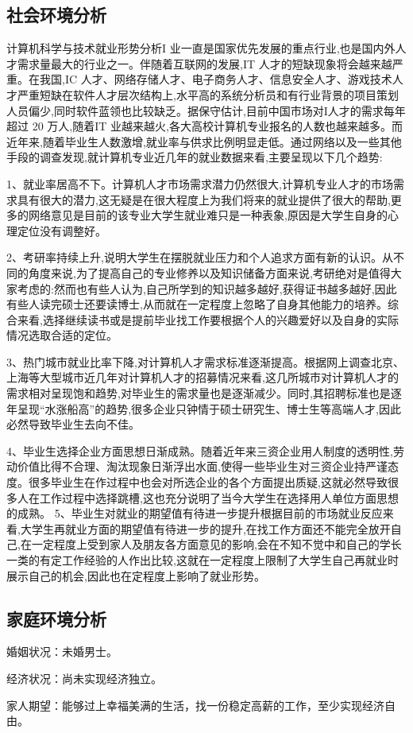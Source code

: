 \documentclass{article}
\begin{document}
\subsection{社会环境分析}
计算机科学与技术就业形势分析I 业一直是国家优先发展的重点行业,也是国内外人才需求量最大的行业之一。伴随着互联网的发展,IT 人才的短缺现象将会越来越严重。在我国,IC 人才、网络存储人才、电子商务人才、信息安全人才、游戏技术人才严重短缺在软件人才层次结构上,水平高的系统分析员和有行业背景的项目策划人员偏少,同时软件蓝领也比较缺乏。据保守估计,目前中国市场对I人才的需求每年超过 20 万人,随着IT 业越来越火,各大高校计算机专业报名的人数也越来越多。而近年来,随着毕业生人数激增,就业率与供求比例明显走低。通过网络以及一些其他手段的调查发现,就计算机专业近几年的就业数据来看,主要呈现以下几个趋势:\par
1、就业率居高不下。计算机人才市场需求潜力仍然很大,计算机专业人才的市场需求具有很大的潜力,这无疑是在很大程度上为我们将来的就业提供了很大的帮助,更多的网络意见是目前的该专业大学生就业难只是一种表象,原因是大学生自身的心理定位没有调整好。\par
2、考研率持续上升,说明大学生在摆脱就业压力和个人追求方面有新的认识。从不同的角度来说,为了提高自己的专业修养以及知识储备方面来说,考研绝对是值得大家考虑的:然而也有些人认为,自己所学到的知识越多越好,获得证书越多越好,因此有些人读完硕士还要读博士,从而就在一定程度上忽略了自身其他能力的培养。综合来看,选择继续读书或是提前毕业找工作要根据个人的兴趣爱好以及自身的实际情况选取合适的定位。\par
3、热门城市就业比率下降,对计算机人才需求标准逐渐提高。根据网上调查北京、上海等大型城市近几年对计算机人才的招募情况来看,这几所城市对计算机人才的需求相对呈现饱和趋势,对毕业生的需求量也是逐渐减少。同时,其招聘标准也是逐年呈现“水涨船高”的趋势,很多企业只钟情于硕士研究生、博士生等高端人才,因此必然导致毕业生去向不佳。\par
4、毕业生选择企业方面思想日渐成熟。随着近年来三资企业用人制度的透明性,劳动价值比得不合理、淘汰现象日渐浮出水面,使得一些毕业生对三资企业持严谨态度。很多毕业生在作过程中也会对所选企业的各个方面提出质疑,这就必然导致很多人在工作过程中选择跳槽,这也充分说明了当今大学生在选择用人单位方面思想的成熟。
5、毕业生对就业的期望值有待进一步提升根据目前的市场就业反应来看,大学生再就业方面的期望值有待进一步的提升,在找工作方面还不能完全放开自己,在一定程度上受到家人及朋友各方面意见的影响,会在不知不觉中和自己的学长一类的有定工作经验的人作出比较,这就在一定程度上限制了大学生自己再就业时展示自己的机会,因此也在定程度上影响了就业形势。\par
\subsection{家庭环境分析}
婚姻状况：未婚男士。\par
经济状况：尚未实现经济独立。\par
家人期望：能够过上幸福美满的生活，找一份稳定高薪的工作，至少实现经济自由。\par
\end{document}
